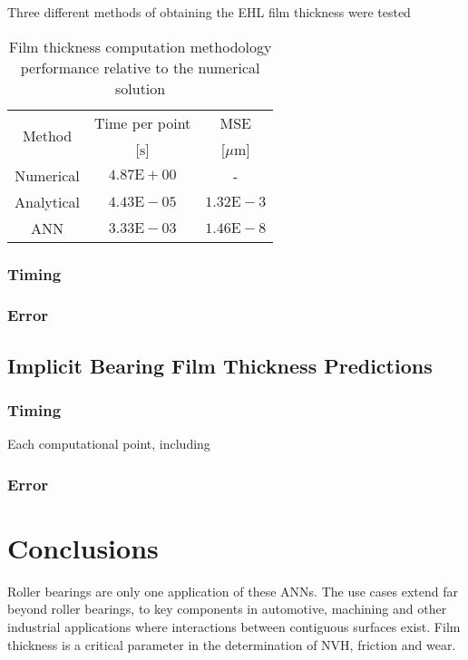 Three different methods of obtaining the EHL film thickness were tested

\begin{table*}
	\caption{Film thickness computation methodology performance relative to the numerical solution}
	\label{Explicit time and MSE}
	\centering
	\renewcommand{\arraystretch}{1.5}%
	\begin{tabular}{|c|c|c|}
	
		\hline \multirow{2}{*}{Method} & Time per point & MSE \\
		\cline{2-3} & [$\mathrm{s}$] & [$\mu \mathrm{m}$] \\
		\hline Numerical & $4.87 \mathrm{E}+00$ & - \\
		\hline Analytical & $4.43 \mathrm{E}-05$ & $1.32 \mathrm{E}-3$ \\
		\hline ANN & $3.33 \mathrm{E}-03$ & $1.46 \mathrm{E}-8$ \\
		\hline
	\end{tabular}
\end{table*}

\subsubsection{Timing}
\subsubsection{Error}

\subsection{Implicit Bearing Film Thickness Predictions}

\subsubsection{Timing}
Each computational point, including 

\subsubsection{Error}


\section{Conclusions}
Roller bearings are only one application of these ANNs. The use cases extend far beyond roller bearings, to key components in automotive, machining and other industrial applications where interactions between contiguous surfaces exist. Film thickness is a critical parameter in the determination of NVH, friction and wear.

